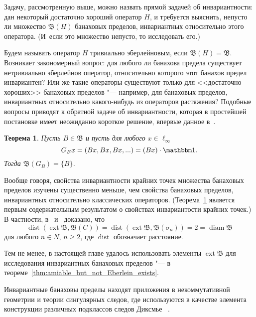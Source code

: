 \documentclass[a4paper,14pt]{article} %
\DeclareMathOperator{\ext}{ext}
\DeclareMathOperator{\diam}{diam}
\DeclareMathOperator{\dist}{dist}
\newcommand{\B}{\ensuremath{\mathfrak{B}}}
\newcommand{\one}{\ensuremath{\mathbbm 1}}
\theoremstyle{plain}
\newtheorem{theorem}[lemma]{Теорема}
\begin{document}
Задачу, рассмотренную выше, можно назвать прямой задачей об инвариантности:
дан некоторый достаточно хороший оператор $H$, и требуется выяснить, непусто ли множество $\B(H)$
банаховых пределов, инвариантных относительно этого оператора.
(И~если это множество непусто, то исследовать его.)

Будем называть оператор $H$ тривиально эберлейновым, если $\B(H)=\B$.
Возникает закономерный вопрос: для любого ли банахова предела существует нетривиально эберлейнов оператор,
относительно которого этот банахов предел инвариантен?
Или же такие операторы существуют только для <<достаточно хороших>>
банаховых пределов "--- например, для банаховых пределов, инвариантных относительно какого-нибудь из операторов растяжения?
Подобные вопросы приводят к обратной задаче об инвариантности,
которая в простейшей постановке имеет неожиданно короткое решение,
впервые данное в~\cite[\S 3]{avdeev2024decomposition}.

\begin{theorem}
	\label{thm:generated_operator_G_B}
	Пусть $B\in \B$
	и пусть для любого $x\in\ell_\infty$
	\begin{equation}
		G_B x = (Bx, Bx, Bx, ...) = (Bx)\cdot\one
		.
	\end{equation}
	Тогда $\B(G_B) = \{B\}$.
\end{theorem}

Вообще говоря, свойства инвариантности крайних точек множества банаховых пределов
изучены существенно меньше, чем свойства банаховых пределов, инвариантных относительно классических операторов.
(Теорема~\ref{thm:generated_operator_G_B}
является первым содержательным результатом о свойствах инвариантости крайних точек.)
В частности, в~\cite[теорема 11]{SS1} и~\cite[теорема 14]{ASSU2} доказано, что
\begin{equation}
	\dist(\ext \B, \B(C)) = \dist(\ext \B, \B(\sigma_n)) = 2 = \diam \B
\end{equation}
для любого $n\in N$, $n\geq2$, где $\dist$ обозначает расстояние.




Тем не менее, в настоящей главе удалось использовать элементы $\ext\B$ для исследования инвариантных банаховых пределов
"--- в теореме~\ref{thm:amiable_but_not_Eberlein_exists}.


Инвариантные банаховы пределы находят приложения в некоммутативной геометрии
и теории сингулярных следов, где используются в качестве элемента конструкции
различных подклассов следов Диксмье
~\cite{carey2003spectral,lord2012singular,sukochev2015characterization,sukochev2016dixmier}.
\end{document}
